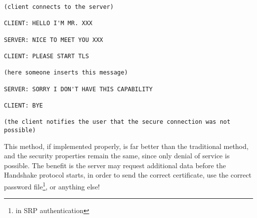\begin{verbatim}
(client connects to the server)

CLIENT: HELLO I'M MR. XXX

SERVER: NICE TO MEET YOU XXX

CLIENT: PLEASE START TLS

(here someone inserts this message)

SERVER: SORRY I DON'T HAVE THIS CAPABILITY

CLIENT: BYE

(the client notifies the user that the secure connection was not possible)

\end{verbatim}


\par
This method, if implemented properly, is far better than the
traditional method, and the security properties remain the same, since only
denial of service is possible. The benefit is the server may request
additional data before the \tls{} Handshake protocol
starts, in order to send the correct certificate, use the correct
password file\footnote{in SRP authentication}, or anything else!



